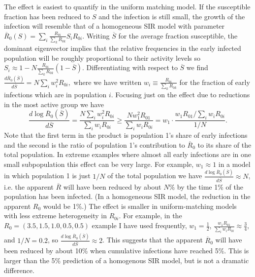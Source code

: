 \documentclass[11pt]{article}
\begin{document}
The effect is easiest to quantify in the uniform matching model.  If the susceptible fraction has been reduced to $S$ and the infection is still small, the growth
of the infection will resemble that of a homogeneous
SIR model with parameter
$\overline{R}_0(S) = \sum_i \frac{R_{0i}}{\sum_k R_{0k}} S_i R_{0i}$. Writing $\overline{S}$ for the
average fraction susceptible, the dominant eigenvector implies that the relative frequencies in the early infected population will be roughly proportional to their activity levels so $S_i \approx 1 - N \frac{R_{0i}}{\sum_k R_{0k}} (1-\overline{S})$. 
Differentiating with 
respect to $\overline{S}$ we find
$\frac{d\overline{R}_0(\overline{S})}{d\overline{S}} = N \sum_i w_i^2 R_{0i},$ where we have 
written $w_i \equiv \frac{R_{0i}}{\sum_k R_{0k}}$ for the fraction of early infections which are in population $i$. Focusing just on the effect due to reductions in the most active group we have
$$\frac{d \log \overline{R}_0(\overline{S})}{d\overline{S}} 
= \frac{N \sum_i w_i^2 R_{0i}}{\sum_i w_i R_{0i}}
\geq \frac{N w_1^2 R_{01}}{\sum_i w_i R_{0i}} = w_1 \cdot \frac{w_1 R_{01}/\sum_i w_i R_{0i}}{1/N}.
$$
Note that the first term in the product is population 1's share of early infections 
and the second is the ratio of population 1's contribution to $\overline{R}_0$ to its share of the total population. In extreme examples
where almost all early infections are in one small subpopulation this effect can be very large. For example, $w_1 \approx 1$ in a model in which population 1 is just $1/N$ of the total population we have $\frac{d \log \overline{R}_0(\overline{S})}{d\overline{S}} \approx N$, i.e. the apparent $\overline{R}$
will have been reduced by about $N\%$ by the time 1\% of the population has been infected.
(In a homogeneous SIR model, the reduction in the apparent $R_0$ would be 1\%.) The effect is smaller in uniform-matching models with less extreme heterogeneity in $R_{0i}$. For example, in the
$R_0 = (3.5, 1.5, 1.0, 0.5, 0.5)$ example I have used frequently, $w_1 = \frac{1}{2}$, $\frac{w_1 R_{01}}{\sum_i w_i R_{0i}} \approx \frac{3}{4},$ and $1/N = 0.2$,
so $\frac{d \log \overline{R}_0(\overline{S})}{d\overline{S}} \approx 2$. This suggests that the apparent $\overline{R}_0$ will have been reduced by about 10\% when cumulative infections have reached 5\%. This is larger than the 5\% prediction of a homogenous SIR model, but
is not a dramatic difference.
\end{document}

